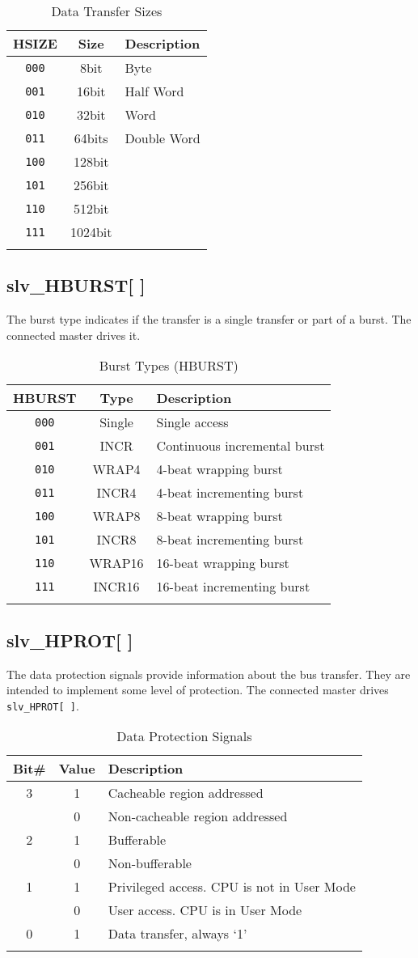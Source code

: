 \begin{longtable}[]{@{}ccl@{}}
\toprule
HSIZE & Size & Description\tabularnewline
\midrule
\endhead
\texttt{000} & 8bit    & Byte\tabularnewline
\texttt{001} & 16bit   & Half Word\tabularnewline
\texttt{010} & 32bit   & Word\tabularnewline
\texttt{011} & 64bits  & Double Word\tabularnewline
\texttt{100} & 128bit  & \tabularnewline
\texttt{101} & 256bit  & \tabularnewline
\texttt{110} & 512bit  & \tabularnewline
\texttt{111} & 1024bit & \tabularnewline
\bottomrule
\caption{Data Transfer Sizes}
\end{longtable}

\subsection{slv\_HBURST[ ]}\label{slv_hburst}

The burst type indicates if the transfer is a single transfer or part of
a burst. The connected master drives it.

\begin{longtable}[]{@{}ccl@{}}
\toprule
HBURST & Type & Description\tabularnewline
\midrule
\endhead
\texttt{000} & Single & Single access\tabularnewline
\texttt{001} & INCR   & Continuous incremental burst\tabularnewline
\texttt{010} & WRAP4  & 4-beat wrapping burst\tabularnewline
\texttt{011} & INCR4  & 4-beat incrementing burst\tabularnewline
\texttt{100} & WRAP8  & 8-beat wrapping burst\tabularnewline
\texttt{101} & INCR8  & 8-beat incrementing burst\tabularnewline
\texttt{110} & WRAP16 & 16-beat wrapping burst\tabularnewline
\texttt{111} & INCR16 & 16-beat incrementing burst\tabularnewline
\bottomrule
\caption{Burst Types (HBURST)}
\end{longtable}

\subsection{slv\_HPROT[ ]}\label{slv_hprot}

The data protection signals provide information about the bus transfer.
They are intended to implement some level of protection. The connected
master drives \texttt{slv\_HPROT[\,]}.

\begin{longtable}[]{@{}ccl@{}}
\toprule
Bit\# & Value & Description\tabularnewline
\midrule
\endhead
3 & 1 & Cacheable region addressed\tabularnewline
& 0 & Non-cacheable region addressed\tabularnewline
2 & 1 & Bufferable\tabularnewline
& 0 & Non-bufferable\tabularnewline
1 & 1 & Privileged access. CPU is not in User Mode\tabularnewline
& 0 & User access. CPU is in User Mode\tabularnewline
0 & 1 & Data transfer, always `1'\tabularnewline
\bottomrule
\caption{Data Protection Signals}
\end{longtable}

